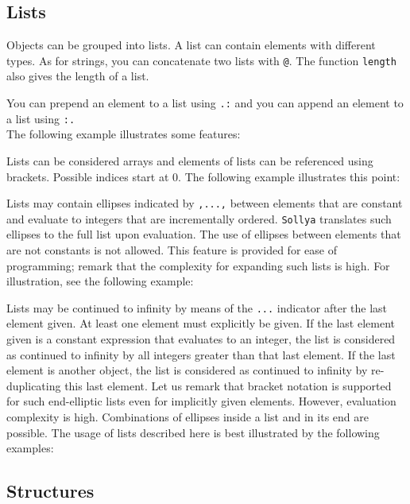 \documentclass[a4paper]{article}
\newcommand{\com}[1]{\texttt{#1}}
\newcommand{\sollya}{\texttt{Sollya}\xspace}
\begin{document}
\subsection{Lists}
Objects can be grouped into lists. A list can contain elements with different types. As for strings, you can concatenate two lists with \com{@}. The function \com{length} also gives the length of a list.

You can prepend an element to a list using \com{.:} and you can append an element to a list using \com{:.}\\ The following example illustrates some features:



Lists can be considered arrays and elements of lists can be
referenced using brackets. Possible indices start at $0$. The
following example illustrates this point:



Lists may contain ellipses indicated by \texttt{,...,} between
elements that are constant and evaluate to integers that are
incrementally ordered. \sollya translates such ellipses to the full
list upon evaluation. The use of ellipses between elements that are not
constants is not allowed. This feature is provided for ease of
programming; remark that the complexity for expanding such lists is
high. For illustration, see the following example:



Lists may be continued to infinity by means of the \texttt{...}
indicator after the last element given. At least one element must
explicitly be given. If the last element given is a constant
expression that evaluates to an integer, the list is considered as
continued to infinity by all integers greater than that last
element. If the last element is another object, the list is considered
as continued to infinity by re-duplicating this last element. Let us remark
that bracket notation is supported for such end-elliptic lists even
for implicitly given elements. However, evaluation complexity is
high. Combinations of ellipses inside a list and in its end are
possible. The usage of lists described here is best illustrated by the
following examples:



\subsection{Structures}
\end{document}
